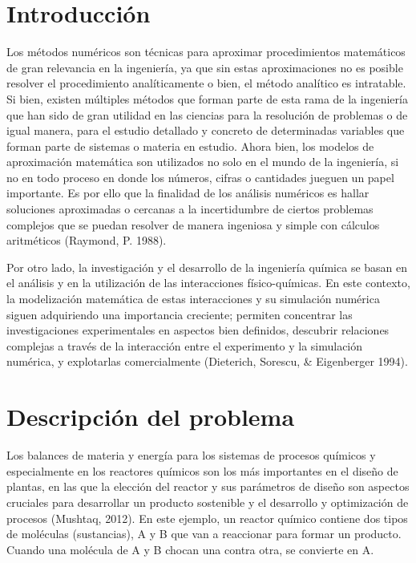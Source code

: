\documentclass{article}
\begin{document}
\section{Introducción}
 Los métodos numéricos son técnicas para aproximar procedimientos matemáticos de gran relevancia en la ingeniería, ya que sin estas aproximaciones no es posible resolver el procedimiento analíticamente o bien, el método analítico es intratable.
Si bien, existen múltiples métodos que forman parte de esta rama de la ingeniería que han sido de gran utilidad en las ciencias para la resolución de problemas o de igual manera, para el estudio detallado y concreto de determinadas variables que forman parte de sistemas o materia en estudio. Ahora bien, los modelos de aproximación matemática son utilizados no solo en el mundo de la ingeniería, si no en todo proceso en donde los números, cifras o cantidades jueguen un papel importante. Es por ello que la finalidad de los análisis numéricos es hallar soluciones aproximadas o cercanas a la incertidumbre de ciertos problemas complejos que se puedan resolver de manera ingeniosa y simple con cálculos aritméticos (Raymond, P. 1988). 

Por otro lado, la investigación y el desarrollo de la ingeniería química se basan en el análisis y en la utilización de las interacciones físico-químicas. En este contexto, la modelización matemática de estas interacciones y su simulación numérica siguen adquiriendo una importancia creciente; permiten concentrar las investigaciones experimentales en aspectos bien definidos, descubrir relaciones complejas a través de la interacción entre el experimento y la simulación numérica, y explotarlas comercialmente (Dieterich, Sorescu, & Eigenberger 1994).



\section{Descripción del problema}
Los balances de materia y energía para los sistemas de procesos químicos y especialmente en los reactores químicos son los más importantes en el diseño de plantas, en las que la elección del reactor y sus parámetros de diseño son aspectos cruciales para desarrollar un producto sostenible y el desarrollo y optimización de procesos (Mushtaq, 2012).
En este ejemplo, un reactor químico contiene dos tipos de moléculas (sustancias), A y B que van a reaccionar para formar un producto. Cuando una molécula de A y B chocan una contra otra, se convierte en A.
\end{document}
